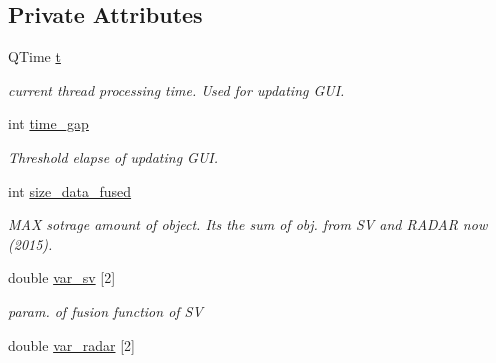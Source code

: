 \subsection*{Private Attributes}
\begin{DoxyCompactItemize}
\item 
\hypertarget{class_sensor_info_acec557aa13acf29cb6592b7b0810f52f}{}Q\+Time \hyperlink{class_sensor_info_acec557aa13acf29cb6592b7b0810f52f}{t}\label{class_sensor_info_acec557aa13acf29cb6592b7b0810f52f}

\begin{DoxyCompactList}\small\item\em current thread processing time. Used for updating G\+U\+I. \end{DoxyCompactList}\item 
\hypertarget{class_sensor_info_a79e684fb00f7bde838c618836e6ef4c7}{}int \hyperlink{class_sensor_info_a79e684fb00f7bde838c618836e6ef4c7}{time\+\_\+gap}\label{class_sensor_info_a79e684fb00f7bde838c618836e6ef4c7}

\begin{DoxyCompactList}\small\item\em Threshold elapse of updating G\+U\+I. \end{DoxyCompactList}\item 
\hypertarget{class_sensor_info_aa91a3251257f08cdff5de11523bb5bff}{}int \hyperlink{class_sensor_info_aa91a3251257f08cdff5de11523bb5bff}{size\+\_\+data\+\_\+fused}\label{class_sensor_info_aa91a3251257f08cdff5de11523bb5bff}

\begin{DoxyCompactList}\small\item\em M\+A\+X sotrage amount of object. It\textquotesingle{}s the sum of obj. from S\+V and R\+A\+D\+A\+R now (2015). \end{DoxyCompactList}\item 
\hypertarget{class_sensor_info_ad9311546eadd687087567a2d836f5161}{}double \hyperlink{class_sensor_info_ad9311546eadd687087567a2d836f5161}{var\+\_\+sv} \mbox{[}2\mbox{]}\label{class_sensor_info_ad9311546eadd687087567a2d836f5161}

\begin{DoxyCompactList}\small\item\em param. of fusion function of S\+V \end{DoxyCompactList}\item 
\hypertarget{class_sensor_info_a963dbcca0e0561aa467df67b0366f409}{}double \hyperlink{class_sensor_info_a963dbcca0e0561aa467df67b0366f409}{var\+\_\+radar} \mbox{[}2\mbox{]}\label{class_sensor_info_a963dbcca0e0561aa467df67b0366f409}


\end{DoxyCompactItemize}
